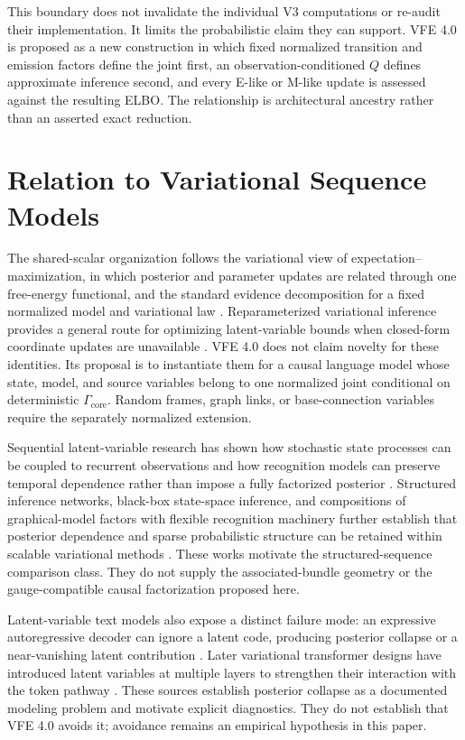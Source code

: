 This boundary does not invalidate the individual V3 computations or re-audit their implementation. It limits the probabilistic claim they can support. VFE 4.0 is proposed as a new construction in which fixed normalized transition and emission factors define the joint first, an observation-conditioned $Q$ defines approximate inference second, and every E-like or M-like update is assessed against the resulting ELBO. The relationship is architectural ancestry rather than an asserted exact reduction.

\chapter{Relation to Variational Sequence Models}

The shared-scalar organization follows the variational view of expectation--maximization, in which posterior and parameter updates are related through one free-energy functional, and the standard evidence decomposition for a fixed normalized model and variational law \citep{Neal1998,Wainwright2008}. Reparameterized variational inference provides a general route for optimizing latent-variable bounds when closed-form coordinate updates are unavailable \citep{Kingma2013}. VFE 4.0 does not claim novelty for these identities. Its proposal is to instantiate them for a causal language model whose state, model, and source variables belong to one normalized joint conditional on deterministic $\Gamma_{\mathrm{core}}$. Random frames, graph links, or base-connection variables require the separately normalized extension.

Sequential latent-variable research has shown how stochastic state processes can be coupled to recurrent observations and how recognition models can preserve temporal dependence rather than impose a fully factorized posterior \citep{chung2015recurrent,fraccaro2016sequential}. Structured inference networks, black-box state-space inference, and compositions of graphical-model factors with flexible recognition machinery further establish that posterior dependence and sparse probabilistic structure can be retained within scalable variational methods \citep{krishnan2017structured,archer2015black,johnson2016composing}. These works motivate the structured-sequence comparison class. They do not supply the associated-bundle geometry or the gauge-compatible causal factorization proposed here.

Latent-variable text models also expose a distinct failure mode: an expressive autoregressive decoder can ignore a latent code, producing posterior collapse or a near-vanishing latent contribution \citep{bowman2016generating}. Later variational transformer designs have introduced latent variables at multiple layers to strengthen their interaction with the token pathway \citep{hu2022fuse}. These sources establish posterior collapse as a documented modeling problem and motivate explicit diagnostics. They do not establish that VFE 4.0 avoids it; avoidance remains an empirical hypothesis in this paper.

